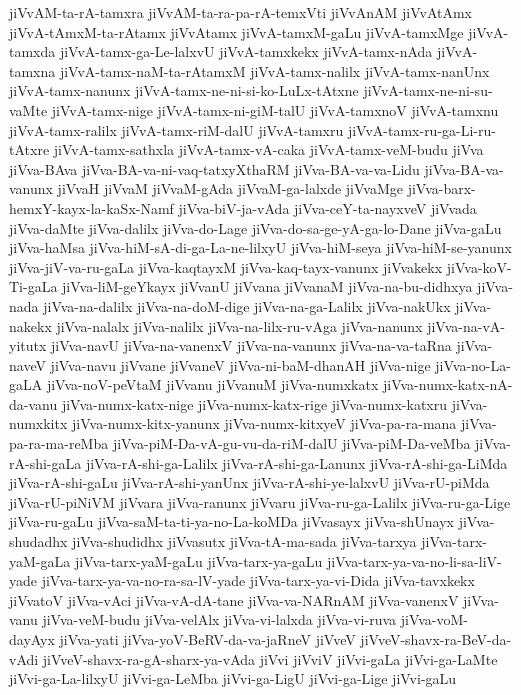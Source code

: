 {jiVvAM-ta-rA-tamxra
jiVvAM-ta-ra-pa-rA-temxVti
jiVvAnAM
jiVvAtAmx
jiVvA-tAmxM-ta-rAtamx
jiVvAtamx
jiVvA-tamxM-gaLu
jiVvA-tamxMge
jiVvA-tamxda
jiVvA-tamx-ga-Le-lalxvU
jiVvA-tamxkekx
jiVvA-tamx-nAda
jiVvA-tamxna
jiVvA-tamx-naM-ta-rAtamxM
jiVvA-tamx-nalilx
jiVvA-tamx-nanUnx
jiVvA-tamx-nanunx
jiVvA-tamx-ne-ni-si-ko-LuLx-tAtxne
jiVvA-tamx-ne-ni-su-vaMte
jiVvA-tamx-nige
jiVvA-tamx-ni-giM-talU
jiVvA-tamxnoV
jiVvA-tamxnu
jiVvA-tamx-ralilx
jiVvA-tamx-riM-dalU
jiVvA-tamxru
jiVvA-tamx-ru-ga-Li-ru-tAtxre
jiVvA-tamx-sathxla
jiVvA-tamx-vA-caka
jiVvA-tamx-veM-budu
jiVva
jiVva-BAva
jiVva-BA-va-ni-vaq-tatxyXthaRM
jiVva-BA-va-va-Lidu
jiVva-BA-va-vanunx
jiVvaH
jiVvaM
jiVvaM-gAda
jiVvaM-ga-lalxde
jiVvaMge
jiVva-barx-hemxY-kayx-la-kaSx-Namf
jiVva-biV-ja-vAda
jiVva-ceY-ta-nayxveV
jiVvada
jiVva-daMte
jiVva-dalilx
jiVva-do-Lage
jiVva-do-sa-ge-yA-ga-lo-Dane
jiVva-gaLu
jiVva-haMsa
jiVva-hiM-sA-di-ga-La-ne-lilxyU
jiVva-hiM-seya
jiVva-hiM-se-yanunx
jiVva-jiV-va-ru-gaLa
jiVva-kaqtayxM
jiVva-kaq-tayx-vanunx
jiVvakekx
jiVva-koV-Ti-gaLa
jiVva-liM-geYkayx
jiVvanU
jiVvana
jiVvanaM
jiVva-na-bu-didhxya
jiVva-nada
jiVva-na-dalilx
jiVva-na-doM-dige
jiVva-na-ga-Lalilx
jiVva-nakUkx
jiVva-nakekx
jiVva-nalalx
jiVva-nalilx
jiVva-na-lilx-ru-vAga
jiVva-nanunx
jiVva-na-vA-yitutx
jiVva-navU
jiVva-na-vanenxV
jiVva-na-vanunx
jiVva-na-va-taRna
jiVva-naveV
jiVva-navu
jiVvane
jiVvaneV
jiVva-ni-baM-dhanAH
jiVva-nige
jiVva-no-La-gaLA
jiVva-noV-peVtaM
jiVvanu
jiVvanuM
jiVva-numxkatx
jiVva-numx-katx-nA-da-vanu
jiVva-numx-katx-nige
jiVva-numx-katx-rige
jiVva-numx-katxru
jiVva-numxkitx
jiVva-numx-kitx-yanunx
jiVva-numx-kitxyeV
jiVva-pa-ra-mana
jiVva-pa-ra-ma-reMba
jiVva-piM-Da-vA-gu-vu-da-riM-dalU
jiVva-piM-Da-veMba
jiVva-rA-shi-gaLa
jiVva-rA-shi-ga-Lalilx
jiVva-rA-shi-ga-Lanunx
jiVva-rA-shi-ga-LiMda
jiVva-rA-shi-gaLu
jiVva-rA-shi-yanUnx
jiVva-rA-shi-ye-lalxvU
jiVva-rU-piMda
jiVva-rU-piNiVM
jiVvara
jiVva-ranunx
jiVvaru
jiVva-ru-ga-Lalilx
jiVva-ru-ga-Lige
jiVva-ru-gaLu
jiVva-saM-ta-ti-ya-no-La-koMDa
jiVvasayx
jiVva-shUnayx
jiVva-shudadhx
jiVva-shudidhx
jiVvasutx
jiVva-tA-ma-sada
jiVva-tarxya
jiVva-tarx-yaM-gaLa
jiVva-tarx-yaM-gaLu
jiVva-tarx-ya-gaLu
jiVva-tarx-ya-va-no-li-sa-liV-yade
jiVva-tarx-ya-va-no-ra-sa-lV-yade
jiVva-tarx-ya-vi-Dida
jiVva-tavxkekx
jiVvatoV
jiVva-vAci
jiVva-vA-dA-tane
jiVva-va-NARnAM
jiVva-vanenxV
jiVva-vanu
jiVva-veM-budu
jiVva-velAlx
jiVva-vi-lalxda
jiVva-vi-ruva
jiVva-voM-dayAyx
jiVva-yati
jiVva-yoV-BeRV-da-va-jaRneV
jiVveV
jiVveV-shavx-ra-BeV-da-vAdi
jiVveV-shavx-ra-gA-sharx-ya-vAda
jiVvi
jiVviV
jiVvi-gaLa
jiVvi-ga-LaMte
jiVvi-ga-La-lilxyU
jiVvi-ga-LeMba
jiVvi-ga-LigU
jiVvi-ga-Lige
jiVvi-gaLu
}
